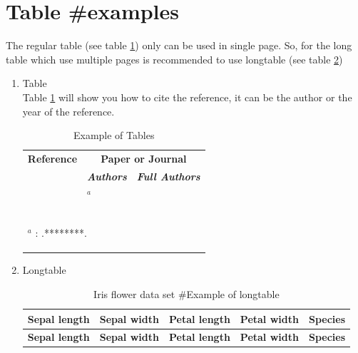 \section{Table \#examples}
The regular table (see table \ref{tab:simpleTab}) only can be used in single page. So, for the long table which use multiple pages is recommended to use longtable (see table \ref{tab:fisher_irish})
\begin{enumerate}
	\item Table\\
	Table \ref{tab:simpleTab} will show you how to cite the reference, it can be the author or the year of the reference.
		\begin{table}[H]
		  \centering \caption{Example of Tables}
			\begin{tabular}{|p{1.5cm}|p{3.5cm}|p{3.5cm}|}
			\hline
			\multicolumn{1}{|c|}{\textbf{Reference}} & \multicolumn{2}{c|}{\textbf{Paper or Journal}} \\
			\cline{2-3}    \multicolumn{1}{|c|}{} & \multicolumn{1}{c|}{\textit{\textbf{Authors}}} & \multicolumn{1}{c|}{\textit{\textbf{Full Authors}}} \\
			\hline
			\cite{Jain2007} & \citet{Jain2007}$^a$ & \citefullauthor{Jain2007} \\
			\hline
			\cite{Kong2009} & \citet{Kong2009} & \citefullauthor{Kong2009} \\
			\hline
			\cite{Michael2008} & \citet{Michael2008} & \citefullauthor{Michael2008} \\
			\hline
			\cite{Wang2008} & \citet{Wang2008} & \citefullauthor{Wang2008} \\
			\hline
			\multicolumn{3}{l}{
				\begin{footnotesize}
					$^a$ : \citeyear{Jain2007}.********. 
				\end{footnotesize}
			} \\
			\end{tabular}%
		  \label{tab:simpleTab}%
		\end{table}%
	\item Longtable
		\begin{center}
			\begin{longtable}{|r|r|r|r|r|}\caption{Iris flower data set \#Example of longtable}\label{tab:fisher_irish}\\
				\hline
				\textbf{Sepal length} & \textbf{Sepal width} & \textbf{Petal length} & \textbf{Petal width} & \textbf{Species} \\
				\hline
				\endfirsthead
				\hline
				\textbf{Sepal length} & \textbf{Sepal width} & \textbf{Petal length} & \textbf{Petal width} & \textbf{Species} \\

\end{longtable}
\end{center}
\end{enumerate}
